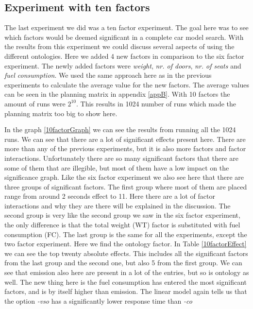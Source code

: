 \documentclass{llncs}
\begin{document}
\subsection{Experiment with ten factors}
The last experiment we did was a ten factor experiment. The goal 
here was to see which factors would be deemed significant in a complete 
car model search. With the results from this experiment we could discuss 
several aspects of using the different ontologies. 
Here we added 4 new factors in comparison to the six factor experiment. The newly 
added factors were \textit{weight}, \textit{nr. of doors}, \textit{nr. of seats} and 
\textit{fuel consumption}. We used the same approach here as in the previous experiments 
to calculate the average value for the new factors. The average values can be seen in the 
planning matrix in appendix \ref{appB}. With 10 factors the amount of runs were 
$2^10$. This results in 1024 number of runs which made the planning matrix too big to show here. 

In the graph \vref{10factorGraph} we can see the results from running all the 1024 runs.
We can see that there are a lot of significant effects present here. There are more than 
any of the previous experiments, but it is also more factors and factor interactions.
Unfortunately there are so many significant factors that there are some of them that are 
illegible, but most of them have a low impact on the significance graph. Like the six factor experiment we also see 
here that there are three groups of significant factors. The first group where most of them 
are placed range from around 2 seconds effect to 11. Here there are a lot of factor interactions 
and why they are there will be explained in the discussion. 
The second group is very like the second group we saw in the six factor experiment, the only difference is 
that the total weight (WT) factor is substituted with fuel consumption (FC). The last group is 
the same for all the experiments, except the two factor experiment. Here we find the ontology factor. 
In Table \vref{10factorEffect} we can see the top twenty absolute effects. This includes all the 
significant factors from the last group and the second one, but also 5 from the first group. 
We can see that emission also here are present in a lot of the entries, but so is ontology 
as well. The new thing here is the fuel consumption has entered the most significant factors, and 
is by itself higher than emission. The linear model again tells us that the option \textit{-vso} has a significantly lower 
response time than \textit{-co} 
\end{document}
